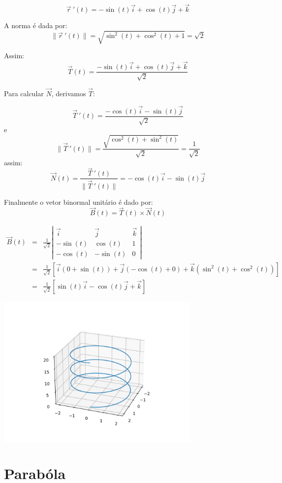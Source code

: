 \documentclass[a4paper,10pt]{article}
\begin{document}
$$\vec{r}\!~'(t)=-\sin(t)\vec{i}+\cos(t)\vec{j}+ \vec{k}$$

A norma é dada por:
$$\|\vec{r}\!~'(t)\|=\sqrt{\sin^2(t)+\cos^2(t)+1}=\sqrt{2}$$

Assim:
$$\vec{T}(t)=\frac{-\sin(t)\vec{i}+\cos(t)\vec{j}+ \vec{k}}{\sqrt{2}}$$

Para calcular $\vec{N}$, derivamos $\vec{T}$:

$$\vec{T}~\!'(t)=\frac{-\cos(t)\vec{i}-\sin(t)\vec{j}}{\sqrt{2}}$$
e
$$\|\vec{T}~\!'(t)\|=\frac{\sqrt{\cos^2(t)+\sin^2(t)}}{\sqrt{2}}=\frac{1}{\sqrt{2}}$$
assim:
$$\vec{N}(t) = \frac{\vec{T}~\!'(t)}{\|\vec{T}~\!'(t)\|}=-\cos(t)\vec{i}-\sin(t)\vec{j}$$


Finalmente o vetor binormal unitário é dado por:
$$\vec{B}(t)= \vec{T}(t)\times \vec{N}(t)$$

\begin{eqnarray*}
 \vec{B}(t)&=&\frac{1}{\sqrt{2}}\left|
 \begin{array}{ccc}
\vec{i}&  \vec{j}&\vec{k}\\
-\sin(t)&\cos(t)&1\\
-\cos(t)&-\sin(t)&0
 \end{array}
 \right|\\
 &=&\frac{1}{\sqrt{2}}\left[\vec{i}\left(0+\sin(t)\right)+\vec{j}\left(-\cos(t)+0\right)+\vec{k}\left(\sin^2(t)+\cos^2(t)\right)\right]\\
 &=&\frac{1}{\sqrt{2}}\left[\sin(t)\vec{i}-\cos(t)\vec{j}+\vec{k}\right]
\end{eqnarray*}



\begin{center}
 \includegraphics[width=10cm]{figs/helice_dextro.png}
 \end{center}

 \section{Parabóla}
 
\end{document}
